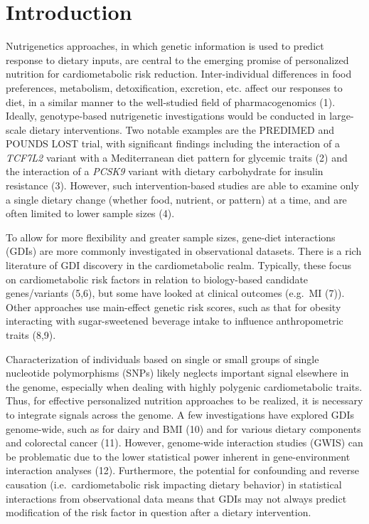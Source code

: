 \documentclass[]{article}
\begin{document}
\hypertarget{introduction}{%
\section{Introduction}\label{introduction}}

Nutrigenetics approaches, in which genetic information is used to
predict response to dietary inputs, are central to the emerging promise
of personalized nutrition for cardiometabolic risk reduction.
Inter-individual differences in food preferences, metabolism,
detoxification, excretion, etc. affect our responses to diet, in a
similar manner to the well-studied field of pharmacogenomics (1).
Ideally, genotype-based nutrigenetic investigations would be conducted
in large-scale dietary interventions. Two notable examples are the
PREDIMED and POUNDS LOST trial, with significant findings including the
interaction of a \emph{TCF7L2} variant with a Mediterranean diet pattern
for glycemic traits (2) and the interaction of a \emph{PCSK9} variant
with dietary carbohydrate for insulin resistance (3). However, such
intervention-based studies are able to examine only a single dietary
change (whether food, nutrient, or pattern) at a time, and are often
limited to lower sample sizes (4).

To allow for more flexibility and greater sample sizes, gene-diet
interactions (GDIs) are more commonly investigated in observational
datasets. There is a rich literature of GDI discovery in the
cardiometabolic realm. Typically, these focus on cardiometabolic risk
factors in relation to biology-based candidate genes/variants (5,6), but
some have looked at clinical outcomes (e.g.~MI (7)). Other approaches
use main-effect genetic risk scores, such as that for obesity
interacting with sugar-sweetened beverage intake to influence
anthropometric traits (8,9).

Characterization of individuals based on single or small groups of
single nucleotide polymorphisms (SNPs) likely neglects important signal
elsewhere in the genome, especially when dealing with highly polygenic
cardiometabolic traits. Thus, for effective personalized nutrition
approaches to be realized, it is necessary to integrate signals across
the genome. A few investigations have explored GDIs genome-wide, such as
for dairy and BMI (10) and for various dietary components and colorectal
cancer (11). However, genome-wide interaction studies (GWIS) can be
problematic due to the lower statistical power inherent in
gene-environment interaction analyses (12). Furthermore, the potential
for confounding and reverse causation (i.e.~cardiometabolic risk
impacting dietary behavior) in statistical interactions from
observational data means that GDIs may not always predict modification
of the risk factor in question after a dietary intervention.
\end{document}
